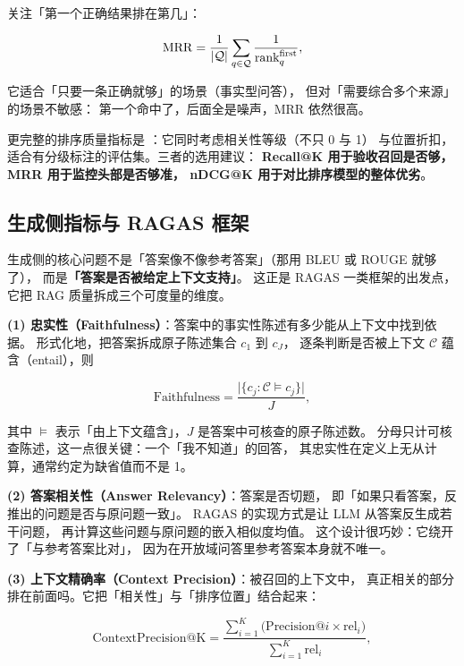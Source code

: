  关注「第一个正确结果排在第几」：

\begin{equation}
\operatorname{MRR} = \frac{1}{|\mathcal{Q}|} \sum_{q \in \mathcal{Q}} \frac{1}{\text{rank}_q^{\text{first}}} ,
\label{eq:mrr}
\end{equation}

它适合「只要一条正确就够」的场景（事实型问答），
但对「需要综合多个来源」的场景不敏感：
第一个命中了，后面全是噪声，MRR 依然很高。

更完整的排序质量指标是 ：它同时考虑相关性等级（不只 0 与 1）
与位置折扣，适合有分级标注的评估集。三者的选用建议：
\textbf{Recall@K 用于验收召回是否够，MRR 用于监控头部是否够准，
nDCG@K 用于对比排序模型的整体优劣}。

\subsection{生成侧指标与 RAGAS 框架}

生成侧的核心问题不是「答案像不像参考答案」（那用 BLEU 或 ROUGE 就够了），
而是\textbf{「答案是否被给定上下文支持」}。
这正是 RAGAS 一类框架的出发点，它把 RAG 质量拆成三个可度量的维度。

\textbf{(1) 忠实性（Faithfulness）}：答案中的事实性陈述有多少能从上下文中找到依据。
形式化地，把答案拆成原子陈述集合 $c_1$ 到 $c_J$，
逐条判断是否被上下文 $\mathcal{C}$ 蕴含（entail），则

\begin{equation}
\text{Faithfulness} = \frac{\big| \{ c_j : \mathcal{C} \models c_j \} \big|}{J} ,
\label{eq:faithfulness}
\end{equation}

其中 $\models$ 表示「由上下文蕴含」，$J$ 是答案中可核查的原子陈述数。
分母只计可核查陈述，这一点很关键：一个「我不知道」的回答，
其忠实性在定义上无从计算，通常约定为缺省值而不是 1。

\textbf{(2) 答案相关性（Answer Relevancy）}：答案是否切题，
即「如果只看答案，反推出的问题是否与原问题一致」。
RAGAS 的实现方式是让 LLM 从答案反生成若干问题，
再计算这些问题与原问题的嵌入相似度均值。
这个设计很巧妙：它绕开了「与参考答案比对」，
因为在开放域问答里参考答案本身就不唯一。

\textbf{(3) 上下文精确率（Context Precision）}：被召回的上下文中，
真正相关的部分排在前面吗。它把「相关性」与「排序位置」结合起来：

\begin{equation}
\text{ContextPrecision@K} =
\frac{\sum_{i=1}^{K} \big( \text{Precision@}i \times \text{rel}_i \big)}
{\sum_{i=1}^{K} \text{rel}_i} ,
\label{eq:context-precision}
\end{equation}

